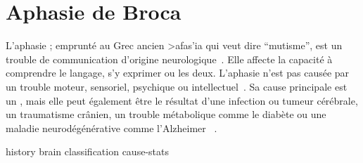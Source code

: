 \chapter{Aphasie de Broca}

L'aphasie ; emprunté au Grec ancien \textgreek{>afas'ia} qui veut dire ``mutisme'',
est un trouble de communication d'origine neurologique~\cite{Larousse}. 
Elle affecte la capacité à comprendre le langage, s'y exprimer ou les deux.
L'aphasie n'est pas causée par un trouble moteur, sensoriel, psychique ou intellectuel~\cite{Chapey_2008}.
Sa cause principale est un , 
mais elle peut également être le résultat d'une infection ou tumeur cérébrale, un traumatisme crânien, 
un trouble métabolique comme le diabète ou une maladie neurodégénérative comme l'Alzheimer ~\cite{Hallowell_2017}.

{history}
{brain}
{classification}
{cause-stats}